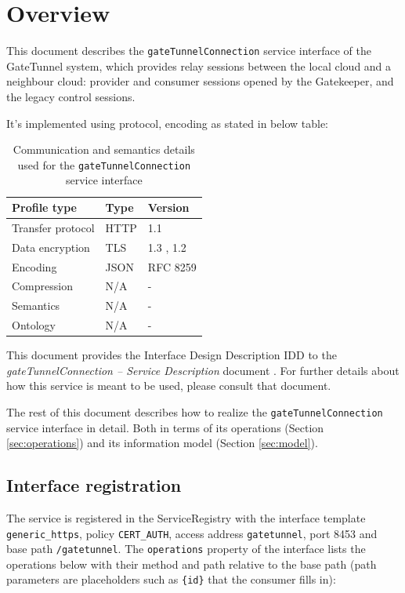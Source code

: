 \documentclass[a4paper]{arrowhead}
\begin{document}
\section{Overview}
\label{sec:overview}

This document describes the \texttt{gate\allowbreak{}Tunnel\allowbreak{}Connection} service interface of the GateTunnel system, which provides relay sessions between the local cloud and a neighbour cloud: provider and consumer sessions opened by the Gatekeeper, and the legacy control sessions.

It's implemented using protocol, encoding as stated in below table:
\begin{table}[ht!]
  \centering
  \begin{tabular}{|l|l|l|}
    \hline
    \rowcolor{gray!33} Profile type & Type & Version \\ \hline
    Transfer protocol & HTTP & 1.1 \cite{rfc9112} \\ \hline
    Data encryption & TLS & 1.3 \cite{rfc8446}, 1.2 \cite{rfc5246} \\ \hline
    Encoding & JSON & RFC 8259 \cite{rfc8259} \\ \hline
    Compression & N/A & - \\ \hline
    Semantics & N/A & - \\ \hline
    Ontology & N/A & - \\ \hline
  \end{tabular}
  \caption{Communication and semantics details used for the \texttt{gate\allowbreak{}Tunnel\allowbreak{}Connection} service interface}
  \label{tab:comunication_semantics_profile}
\end{table}

This document provides the Interface Design Description IDD to the \textit{gateTunnelConnection -- Service Description} document \cite{gt-gateTunnelConnection-sd}.
For further details about how this service is meant to be used, please consult that document.

The rest of this document describes how to realize the \texttt{gate\allowbreak{}Tunnel\allowbreak{}Connection} service
interface in detail. Both in terms of its operations (Section \ref{sec:operations}) and its information model (Section \ref{sec:model}).

\subsection{Interface registration}

The service is registered in the ServiceRegistry with the interface template \texttt{generic\_\allowbreak{}https}, policy \texttt{CERT\_\allowbreak{}AUTH}, access address \texttt{gatetunnel}, port 8453 and base path \texttt{/\allowbreak{}gatetunnel}. The \texttt{operations} property of the interface lists the operations below with their method and path relative to the base path (path parameters are placeholders such as \texttt{\{id\}} that the consumer fills in):
\end{document}
